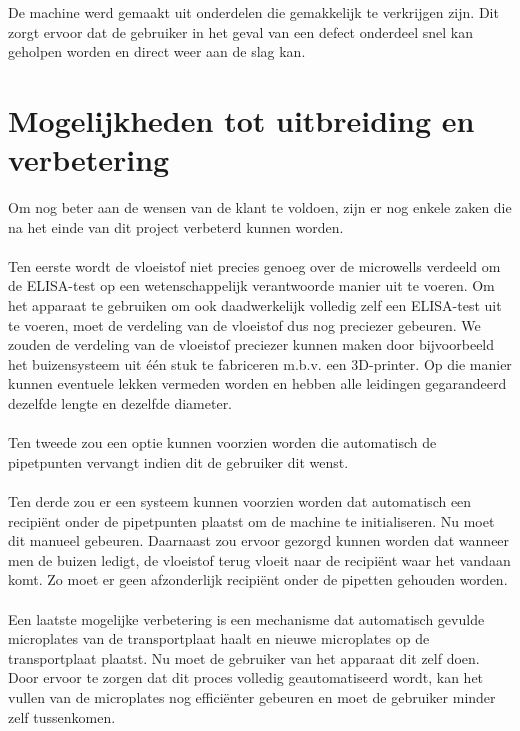 \documentclass[a4paper,twoside,kulak]{kulakreport} %
\begin{document}
De machine werd gemaakt uit onderdelen die gemakkelijk te verkrijgen zijn. Dit zorgt ervoor dat de gebruiker in het geval van een defect onderdeel snel kan geholpen worden en direct weer aan de slag kan.

\chapter{Mogelijkheden tot uitbreiding en verbetering}

Om nog beter aan de wensen van de klant te voldoen, zijn er nog enkele zaken die na het einde van dit project verbeterd kunnen worden. \\ \\
Ten eerste wordt de vloeistof niet precies genoeg over de microwells verdeeld om de ELISA-test op een wetenschappelijk verantwoorde manier uit te voeren. Om het apparaat te gebruiken om ook daadwerkelijk volledig zelf een ELISA-test uit te voeren, moet de verdeling van de vloeistof dus nog preciezer gebeuren. We zouden de verdeling van de vloeistof preciezer kunnen maken door bijvoorbeeld het buizensysteem uit één stuk te fabriceren m.b.v. een 3D-printer. Op die manier kunnen eventuele lekken vermeden worden en hebben alle leidingen gegarandeerd dezelfde lengte en dezelfde diameter. \\ \\
Ten tweede zou een optie kunnen voorzien worden die automatisch de pipetpunten vervangt indien dit de gebruiker dit wenst. 
\\ \\
Ten derde zou er een systeem kunnen voorzien worden dat automatisch een recipiënt onder de pipetpunten plaatst om de machine te initialiseren. Nu moet dit manueel gebeuren. Daarnaast zou ervoor gezorgd kunnen worden dat wanneer men de buizen ledigt, de vloeistof terug vloeit naar de recipiënt waar het vandaan komt. Zo moet er geen afzonderlijk recipiënt onder de pipetten gehouden worden. 
\\ \\
Een laatste mogelijke verbetering is een mechanisme dat automatisch gevulde microplates  van de transportplaat haalt en nieuwe microplates op de transportplaat plaatst. Nu moet de gebruiker van het apparaat dit zelf doen. Door ervoor te zorgen dat dit proces volledig geautomatiseerd wordt, kan het vullen van de microplates nog efficiënter gebeuren en moet de gebruiker minder zelf tussenkomen. \\ \\
\end{document}
